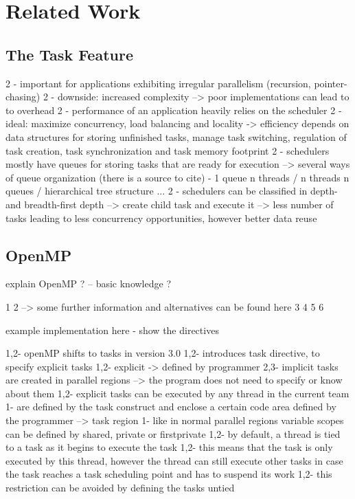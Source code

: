 \section{Related Work}

\subsection{The Task Feature}
 2 - important for applications exhibiting irregular parallelism (recursion, pointer-chasing)
 2 - downside: increased complexity --> poor implementations can lead to to overhead
 2 - performance of an application heavily relies on the scheduler
 2 - ideal: maximize concurrency, load balancing and locality
 	-> efficiency depends on data structures for storing unfinished tasks, manage task switching, regulation of task creation, task synchronization and task memory footprint
 2 - schedulers mostly have queues for storing tasks that are ready for execution
 	--> several ways of queue organization (there is a source to cite)
 		- 1 queue n threads / n threads n queues / hierarchical tree structure ...
 2 - schedulers can be classified in depth- and breadth-first 
 	depth --> create child task and execute it --> less number of tasks leading to less concurrency opportunities, however better data reuse
 	

\subsection{OpenMP}

explain OpenMP ? -- basic knowledge ?

1\cite{Ayguade.2009}
2\cite{LaGrone.2011} --> some further information and alternatives can be found here
3\cite{MKlemm.2018}
4\cite{Qawasmeh.2014}
5\cite{Duran.2008}
6\cite{Furlinger.2009}

 example implementation here - show the directives

  1,2- openMP shifts to tasks in version 3.0
  1,2- introduces task directive, to specify explicit tasks
  	1,2- explicit -> defined by programmer
    2,3- implicit tasks are created in parallel regions 
    --> the program does not need to specify or know about them
  1,2- explicit tasks can be executed by any thread in the current team
  1- are defined by the task construct and enclose a certain code area defined by the programmer --> task region
  1- like in normal parallel regions variable scopes can be defined by shared, private or firstprivate
  1,2- by default, a thread is tied to a task as it begins to execute the task
    1,2- this means that the task is only executed by this thread, however the thread can still execute other tasks in case the task reaches a task scheduling point and has to suspend its work
    1,2- this restriction can be avoided by defining the tasks untied
    
